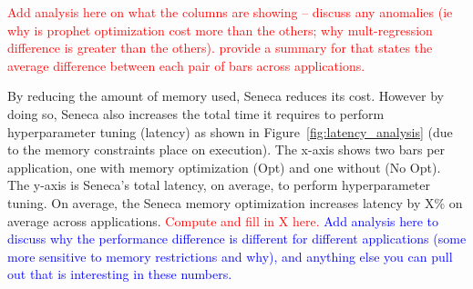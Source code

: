 \textcolor{red}{Add analysis here on what the columns are showing -- discuss any anomalies (ie why is prophet optimization cost more than the others; why mult-regression difference is greater than the others). provide a summary for that states the average difference between each pair of bars across applications.}

By reducing the amount of memory used, Seneca reduces its cost.  However by doing so, Seneca also 
increases the total time it requires to perform hyperparameter tuning (latency) as shown 
in Figure~\ref{fig:latency_analysis} (due to the memory constraints place on execution).  The x-axis shows two bars per application, one with memory optimization (Opt) and one without (No Opt).  The y-axis is 
Seneca's total latency, on average, to perform hyperparameter tuning. 
On average, the Seneca memory optimization increases latency by X\% on average across applications.
\textcolor{red}{Compute and fill in X here.}
\textcolor{blue}{Add analysis here to discuss why the performance difference is different for different
applications (some more sensitive to memory restrictions and why), and anything else you can pull out that is interesting in these numbers.}


